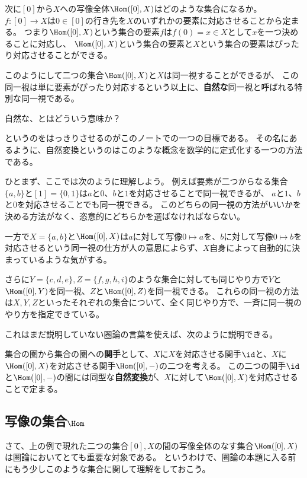 \documentclass{jsarticle}
\begin{document}
\vspace{10pt}

次に$[0]$から$X$への写像全体$\Hom([0],X)$はどのような集合になるか。
$f:[0] \to X$は$0 \in [0]$の行き先を$X$のいずれかの要素に対応させることから定まる。
つまり$\Hom([0],X)$という集合の要素$f$は$f(0) = x \in X$として$x$を一つ決めることに対応し、
$\Hom([0],X)$という集合の要素と$X$という集合の要素はぴったり対応させることができる。

このようにして二つの集合$\Hom([0],X)$と$X$は同一視することができるが、
この同一視は単に要素がぴったり対応するという以上に、\textbf{自然な}同一視と呼ばれる特別な同一視である。

\begin{center}
自然な、とはどういう意味か？
\end{center}
というのをはっきりさせるのがこのノートでの一つの目標である。
その名にあるように、自然変換というのはこのような概念を数学的に定式化する一つの方法である。

\vspace{10pt}

ひとまず、ここでは次のように理解しよう。
例えば要素が二つからなる集合$\{a,b\}$と$[1]=\{0,1\}$は$a$と$0$、$b$と$1$を対応させることで同一視できるが、
$a$と$1$、$b$と$0$を対応させることでも同一視できる。
このどちらの同一視の方法がいいかを決める方法がなく、恣意的にどちらかを選ばなければならない。

一方で$X=\{a,b\}$と$\Hom([0],X)$は$a$に対して写像$0\mapsto a$を、$b$に対して写像$0\mapsto b$を対応させるという同一視の仕方が人の意思によらず、$X$自身によって自動的に決まっているような気がする。

さらに$Y=\{c,d,e\}, Z=\{f,g,h,i\}$のような集合に対しても同じやり方で$Y$と$\Hom([0],Y)$を同一視、$Z$と$\Hom([0],Z)$を同一視できる。
これらの同一視の方法は$X, Y, Z$といったそれぞれの集合について、全く同じやり方で、一斉に同一視のやり方を指定できている。

これはまだ説明していない圏論の言葉を使えば、次のように説明できる。

\begin{thm}
集合の圏から集合の圏への\textbf{関手}として、$X$に$X$を対応させる関手$\id$と、$X$に$\Hom([0],X)$を対応させる関手$\Hom([0],-)$の二つを考える。
この二つの関手$\id$と$\Hom([0],-)$の間には同型な\textbf{自然変換}が、$X$に対して$\Hom([0],X)$を対応させることで定まる。
\end{thm}

\subsection{写像の集合$\Hom$}
さて、上の例で現れた二つの集合$[0], X$の間の写像全体のなす集合$\Hom([0],X)$は圏論においてとても重要な対象である。
というわけで、圏論の本題に入る前にもう少しこのような集合に関して理解をしておこう。
\end{document}
